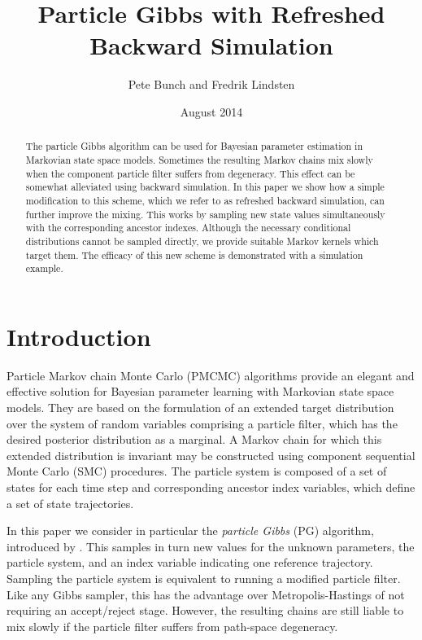 \documentclass[10pt]{article}
\title{Particle Gibbs with Refreshed Backward Simulation}
\author{Pete Bunch and Fredrik Lindsten}
\date{August 2014}
\begin{document}
\maketitle

\begin{abstract}
 The particle Gibbs algorithm can be used for Bayesian parameter estimation in Markovian state space models. Sometimes the resulting Markov chains mix slowly when the component particle filter suffers from degeneracy. This effect can be somewhat alleviated using backward simulation. In this paper we show how a simple modification to this scheme, which we refer to as refreshed backward simulation, can further improve the mixing. This works by sampling new state values simultaneously with the corresponding ancestor indexes. Although the necessary conditional distributions cannot be sampled directly, we provide suitable Markov kernels which target them. The efficacy of this new scheme is demonstrated with a simulation example.
\end{abstract}


\section{Introduction}
Particle Markov chain Monte Carlo (PMCMC) algorithms \citep{Andrieu2010,Olsson2011,Chopin2013,Lindsten2014} provide an elegant and effective solution for Bayesian parameter learning with Markovian state space models. They are based on the formulation of an extended target distribution over the system of random variables comprising a particle filter, which has the desired posterior distribution as a marginal. A Markov chain for which this extended distribution is invariant may be constructed using component sequential Monte Carlo (SMC) procedures. The particle system is composed of a set of states for each time step and corresponding ancestor index variables, which define a set of state trajectories.

In this paper we consider in particular the \emph{particle Gibbs} (PG) algorithm, introduced by \citep{Andrieu2010}. This samples in turn new values for the unknown parameters, the particle system, and an index variable indicating one reference trajectory. Sampling the particle system is equivalent to running a modified particle filter. Like any Gibbs sampler, this has the advantage over Metropolis-Hastings of not requiring an accept/reject stage. However, the resulting chains are still liable to mix slowly if the particle filter suffers from path-space degeneracy.
\end{document}
